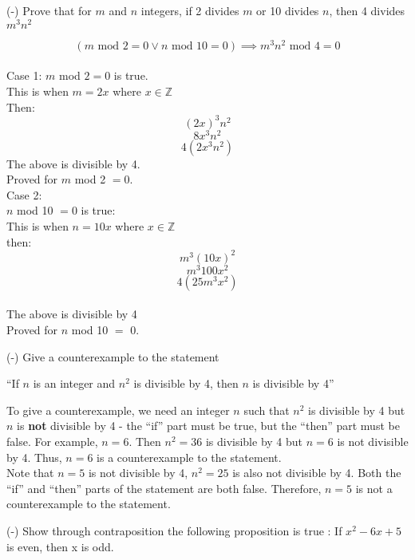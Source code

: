 \documentclass{exam}
\begin{document}
\begin{questions}
\question (-) Prove that for $m$ and $n$ integers, if 2 divides $m$ or 10 divides $n$, then 4 divides $m^{3}n^{2}$
\begin{solution}
 $$(m \text{ mod } 2 = 0 \lor n \text{ mod } 10 = 0) \implies m^{3}n^{2} \text{ mod } 4 = 0 $$
 \\Case 1: $m$ mod $2 = 0$ is true.
 \\This is when $m=2x$ where $x \in \mathbb{Z}$
 \\Then:
 $$(2x)^{3}n^{2}$$
 $$8x^{3}n^{2} $$
 $$4(2x^{3}n^{2}) $$
The above is divisible by 4.
\\Proved for $m$ mod 2 $= 0$.
\\Case 2:
\\$n$ mod 10 $=0$ is true:
 \\This is when $n=10x$ where $x \in \mathbb{Z}$
 \\then:
 $${m^{3}(10x)^{2}} $$
 $${m^{3}100x^{2}} $$
  $${4(25m^{3}x^{2})} $$
\\The above is divisible by 4
\\Proved for $n$ mod 10 $=$ 0.
\end{solution}




\question (-) Give a counterexample to the statement
\begin{center}
    ``If $n$ is an integer and $n^2$ is divisible by 4, then $n$ is divisible by 4''
\end{center}
\begin{solution}
To give a counterexample, we need an integer $n$ such that $n^2$ is divisible by 4 but $n$ is \textbf{not} divisible by 4 - the ``if'' part must be true, but the ``then'' part must be false. For example, $n=6$. Then $n^2=36$ is divisible by 4 but $n=6$ is not divisible by 4. Thus, $n=6$ is a counterexample to the statement. \\
Note that $n=5$ is not divisible by 4, $n^2 = 25$ is also not divisible by 4. Both the ``if'' and ``then'' parts of the statement are both false. Therefore, $n=5$ is not a counterexample to the statement.
\end{solution}


\question (-) Show through contraposition the following proposition is true : If $x^{2} - 6x + 5$ is even, then x is odd.


\end{questions}
\end{document}
